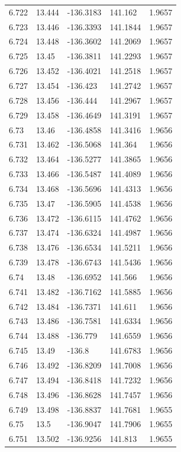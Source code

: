 \begin{tabular}{lllll}
6.722 & 13.444 & -136.3183 & 141.162 & 1.9657 \\
6.723 & 13.446 & -136.3393 & 141.1844 & 1.9657 \\
6.724 & 13.448 & -136.3602 & 141.2069 & 1.9657 \\
6.725 & 13.45 & -136.3811 & 141.2293 & 1.9657 \\
6.726 & 13.452 & -136.4021 & 141.2518 & 1.9657 \\
6.727 & 13.454 & -136.423 & 141.2742 & 1.9657 \\
6.728 & 13.456 & -136.444 & 141.2967 & 1.9657 \\
6.729 & 13.458 & -136.4649 & 141.3191 & 1.9657 \\
6.73 & 13.46 & -136.4858 & 141.3416 & 1.9656 \\
6.731 & 13.462 & -136.5068 & 141.364 & 1.9656 \\
6.732 & 13.464 & -136.5277 & 141.3865 & 1.9656 \\
6.733 & 13.466 & -136.5487 & 141.4089 & 1.9656 \\
6.734 & 13.468 & -136.5696 & 141.4313 & 1.9656 \\
6.735 & 13.47 & -136.5905 & 141.4538 & 1.9656 \\
6.736 & 13.472 & -136.6115 & 141.4762 & 1.9656 \\
6.737 & 13.474 & -136.6324 & 141.4987 & 1.9656 \\
6.738 & 13.476 & -136.6534 & 141.5211 & 1.9656 \\
6.739 & 13.478 & -136.6743 & 141.5436 & 1.9656 \\
6.74 & 13.48 & -136.6952 & 141.566 & 1.9656 \\
6.741 & 13.482 & -136.7162 & 141.5885 & 1.9656 \\
6.742 & 13.484 & -136.7371 & 141.611 & 1.9656 \\
6.743 & 13.486 & -136.7581 & 141.6334 & 1.9656 \\
6.744 & 13.488 & -136.779 & 141.6559 & 1.9656 \\
6.745 & 13.49 & -136.8 & 141.6783 & 1.9656 \\
6.746 & 13.492 & -136.8209 & 141.7008 & 1.9656 \\
6.747 & 13.494 & -136.8418 & 141.7232 & 1.9656 \\
6.748 & 13.496 & -136.8628 & 141.7457 & 1.9656 \\
6.749 & 13.498 & -136.8837 & 141.7681 & 1.9655 \\
6.75 & 13.5 & -136.9047 & 141.7906 & 1.9655 \\
6.751 & 13.502 & -136.9256 & 141.813 & 1.9655 \\

\end{tabular}
